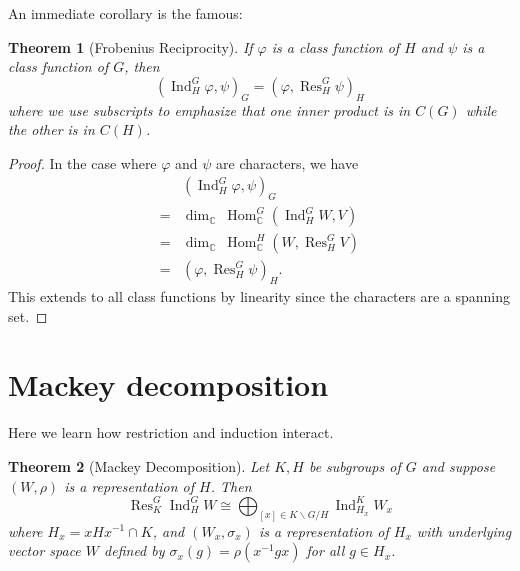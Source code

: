 \documentclass[12pt]{article}
\theoremstyle{plain}
\newtheorem{theorem}{Theorem}[section]
\theoremstyle{definition}
\theoremstyle{remark}
\numberwithin{equation}{section}
\begin{document}
An immediate corollary is the famous:

\begin{theorem}[Frobenius Reciprocity]
If $\varphi$ is a class function of $H$ and $\psi$ is a class function
of $G$, then
\[
(\operatorname{Ind}_H^G \varphi, \psi)_G
=
(\varphi, \operatorname{Res}_H^G \psi)_H
\]
where we use subscripts to emphasize that one inner product is in $C(G)$
while the other is in $C(H)$.
\end{theorem}

\begin{proof}
In the case where $\varphi$ and $\psi$ are characters,
we have
\begin{align*}
&(\operatorname{Ind}_H^G \varphi, \psi)_G\\
=& \dim_\mathbb{C}\ \operatorname{Hom}^G_\mathbb{C}(\operatorname{Ind}_H^G W, V)\\
=& \dim_\mathbb{C}\ \operatorname{Hom}^H_\mathbb{C}(W,\operatorname{Res}_H^G  V)\\
=&(\varphi, \operatorname{Res}_H^G \psi)_H .
\end{align*}
This extends to all class functions by linearity since the characters
are a spanning set.
\end{proof}

\section{Mackey decomposition}

Here we learn how restriction and induction interact.

\begin{theorem}[Mackey Decomposition]
Let $K,H$ be subgroups of $G$ and suppose $(W,\rho)$ is a representation of
$H$.
Then
\[
\operatorname{Res}^G_K \operatorname{Ind}^G_H W
\cong
\bigoplus_{[x] \in K\backslash G / H}
\operatorname{Ind}_{H_x}^K W_x
\]
where $H_x = xHx^{-1} \cap K$, and $(W_x,\sigma_x)$ is a representation
of $H_x$ with underlying vector space $W$
defined by $\sigma_x(g)=\rho(x^{-1}gx)$ for all $g \in H_x$.
\end{theorem}
\end{document}
